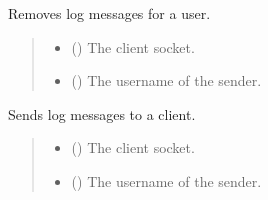 \documentclass[letterpaper,10pt,english]{sphinxmanual}
\begin{document}
\begin{fulllineitems}
\begin{fulllineitems}
\label{\detokenize{server1:server1.Server.remove_log_messages}}
\pysigstartsignatures
{}
\pysigstopsignatures
\sphinxAtStartPar
Removes log messages for a user.
\begin{quote}\begin{description}
\begin{itemize}
\item {} 
\sphinxAtStartPar
{} () \textendash{} The client socket.

\item {} 
\sphinxAtStartPar
{} () \textendash{} The username of the sender.

\end{itemize}

\end{description}\end{quote}

\end{fulllineitems}


\begin{fulllineitems}
\label{\detokenize{server1:server1.Server.send_log_messages}}
\pysigstartsignatures
{}
\pysigstopsignatures
\sphinxAtStartPar
Sends log messages to a client.
\begin{quote}\begin{description}
\begin{itemize}
\item {} 
\sphinxAtStartPar
{} () \textendash{} The client socket.

\item {} 
\sphinxAtStartPar
{} () \textendash{} The username of the sender.


\end{itemize}
\end{description}
\end{quote}
\end{fulllineitems}
\end{fulllineitems}
\end{document}

